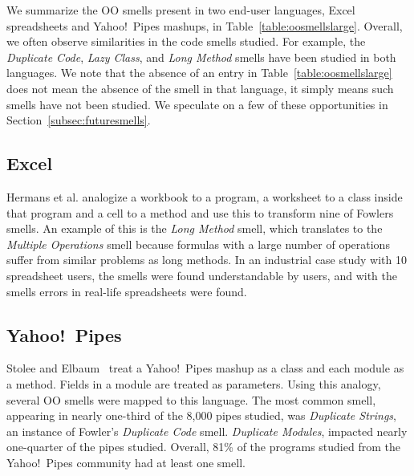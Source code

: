 \documentclass{sig-alternate}
\newcommand{\todo}[1]{\textbf{TODO: #1}}
\begin{document}
 We summarize the OO smells present in two end-user languages, Excel spreadsheets and Yahoo!\ Pipes mashups, in Table~\ref{table:oosmellslarge}.
 Overall, we often observe similarities in the code smells studied. For example, the \emph{Duplicate Code}, \emph{Lazy Class}, and \emph{Long Method} smells  have been studied in both languages. 
We note that the absence of an entry in Table~\ref{table:oosmellslarge} does not mean the absence of the smell in that language, it simply means such smells have not been studied. We speculate on a few of these opportunities in Section~\ref{subsec:futuresmells}. 

 
 

 \subsection{Excel}
Hermans et al. \cite{Hermans2012inter,Hermans2012intra} analogize a workbook to a program, a worksheet to a class inside that program and a cell to a method and use this to transform nine of Fowlers smells.
An example of this is the \emph{Long Method} smell, which translates to the \emph{Multiple Operations} smell because formulas with a large number of operations suffer from similar problems as long methods. In an industrial case study with 10 spreadsheet users, the smells were found understandable by users, and with the smells errors in real-life spreadsheets were found.

\subsection{Yahoo!\ Pipes}
Stolee and Elbaum~\cite{Stolee2011, StoleeTSE2013} treat a Yahoo!\ Pipes mashup as a class and each module as a method.  Fields in a module are treated as parameters. Using this analogy,  several OO smells were mapped to this language. The most common smell, appearing in nearly one-third of the 8,000 pipes studied, was \emph{Duplicate Strings}, an instance of Fowler's \emph{Duplicate Code} smell. 
\emph{Duplicate Modules}, impacted nearly one-quarter of the pipes studied. 
 Overall, 81\% of the programs studied from the Yahoo!\ Pipes community had at least one smell. 
 
\end{document}
